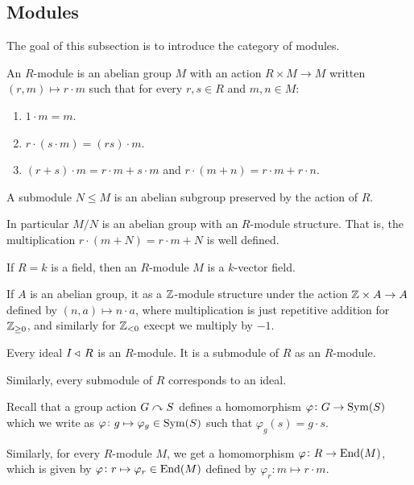 \documentclass[11pt,a4paper]{article}
\begin{document}
\subsection{Modules}
The goal of this subsection is to introduce the category of modules.

\begin{definition}[$R$-module]
  An $R$-module is an abelian group $M$ with an action
  $R \times M \to M$ written $(r,m) \mapsto r \cdot m$
  such that for every $r,s \in R$ and $m,n \in M$:
  \begin{enumerate}
    \item[(1)] $1 \cdot m = m$.
    \item[(2)] $r \cdot (s \cdot m) = (rs) \cdot m$.
    \item[(3)] $(r + s) \cdot m = r \cdot m + s \cdot m$ and
      $r \cdot (m + n) = r \cdot m + r \cdot n$.
  \end{enumerate}
\end{definition}

\begin{remark}
  A submodule $N \leqslant M$ is an abelian subgroup preserved by the action
  of $R$.
\end{remark}

\begin{remark}
  In particular $M/N$ is an abelian group with an $R$-module structure.
  That is, the multiplication $r \cdot (m + N) = r \cdot m + N$
  is well defined.
\end{remark}

\begin{example}
  If $R = k$ is a field, then an $R$-module $M$ is a $k$-vector field.
\end{example}

\begin{example}
  If $A$ is an abelian group,
  it as a $\mathbb{Z}$-module structure under the action $\mathbb{Z} \times A \to A$
  defined by $(n,a) \mapsto n \cdot a$,
  where multiplication is just repetitive addition for $\mathbb{Z}_{\geq 0}$,
  and similarly for $\mathbb{Z}_{< 0}$ execpt we multiply by $-1$.
\end{example}

\begin{example}
  Every ideal $I \triangleleft\, R$ is an $R$-module.
  It is a submodule of $R$ as an $R$-module.

  Similarly, every submodule of $R$ corresponds to an ideal.
\end{example}

\begin{remark}
  Recall that a group action $G \curvearrowright S$ defines
  a homomorphism $\varphi \colon G \to \operatorname{Sym}(S)$
  which we write as $\varphi \colon g \mapsto \varphi_g \in \operatorname{Sym}(S)$
  such that $\varphi_g(s) = g \cdot s$.

  Similarly, for every $R$-module $M$,
  we get a homomorphism $\varphi \colon R \to \operatorname{End}(M)$,
  which is given by $\varphi \colon r \mapsto \varphi_r \in \operatorname{End}(M)$
  defined by $\varphi_r \colon m \mapsto r \cdot m$.
\end{remark}
\end{document}
